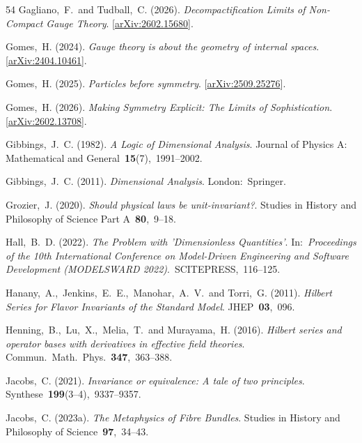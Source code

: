 \documentclass[12pt]{article}
\numberwithin{equation}{section}
\begin{document}
\begin{small}
\begin{thebibliography}{54}
{Gagliano,~F.~and Tudball,~C.} (2026).
{\em Decompactification Limits of Non-Compact Gauge Theory}.
[\href{https://arxiv.org/abs/2602.15680}{arXiv:2602.15680}].

{Gomes,~H.} (2024).
{\em Gauge theory is about the geometry of internal spaces}.
[\href{https://arxiv.org/abs/2404.10461}{arXiv:2404.10461}].

{Gomes,~H.} (2025).
{\em Particles before symmetry}.
[\href{https://arxiv.org/abs/2509.25276}{arXiv:2509.25276}].

{Gomes,~H.} (2026).
{\em Making Symmetry Explicit: The Limits of Sophistication}.
[\href{https://arxiv.org/abs/2602.13708}{arXiv:2602.13708}].

{Gibbings,~J.~C.} (1982).
{\em A Logic of Dimensional Analysis}.
Journal of Physics A: Mathematical and General~\textbf{15}(7),~1991--2002.

{Gibbings,~J.~C.} (2011).
{\em Dimensional Analysis}.
London:~Springer.

{Grozier,~J.} (2020).
{\em Should physical laws be unit-invariant?}.
Studies in History and Philosophy of Science Part A~\textbf{80},~9--18.

{Hall,~B.~D.} (2022).
{\em The Problem with 'Dimensionless Quantities'}.
In:~{\em Proceedings of the 10th International Conference on Model-Driven Engineering and Software Development (MODELSWARD 2022)}.~SCITEPRESS,~116--125.

{Hanany,~A.,~Jenkins,~E.~E.,~Manohar,~A.~V.~and Torri,~G.} (2011).
{\em Hilbert Series for Flavor Invariants of the Standard Model}.
JHEP~\textbf{03},~096.

{Henning,~B.,~Lu,~X.,~Melia,~T.~and Murayama,~H.} (2016).
{\em Hilbert series and operator bases with derivatives in effective field theories}.
Commun.~Math.~Phys.~\textbf{347},~363--388.

{Jacobs,~C.} (2021).
{\em Invariance or equivalence: A tale of two principles}.
Synthese~\textbf{199}(3--4),~9337--9357.

{Jacobs,~C.} (2023a).
{\em The Metaphysics of Fibre Bundles}.
Studies in History and Philosophy of Science~\textbf{97},~34--43.


\end{thebibliography}
\end{small}
\end{document}
